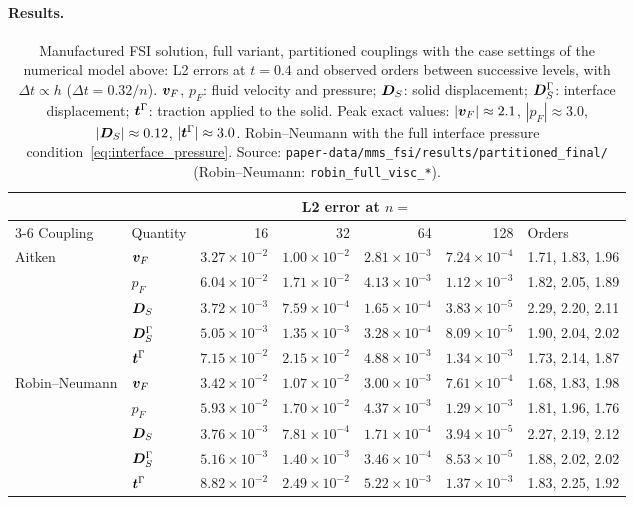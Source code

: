 \paragraph{Results.}
\begin{table}[htbp]
	\centering
	\footnotesize
	\setlength{\tabcolsep}{4pt}
	\caption{Manufactured FSI solution, full variant, partitioned couplings with the case settings of the numerical model above: L2 errors at $t = 0.4$ and observed orders between successive levels, with $\Delta t \propto h$ ($\Delta t = 0.32/n$). $\boldsymbol{v}_F$, $p_F$: fluid velocity and pressure; $\boldsymbol{D}_S$: solid displacement; $\boldsymbol{D}_S^\Gamma$: interface displacement; $\boldsymbol{t}^\Gamma$: traction applied to the solid. Peak exact values: $|\boldsymbol{v}_F| \approx 2.1$, $|p_F| \approx 3.0$, $|\boldsymbol{D}_S| \approx 0.12$, $|\boldsymbol{t}^\Gamma| \approx 3.0$. Robin--Neumann with the full interface pressure condition~\eqref{eq:interface_pressure}. Source: \texttt{paper-data/mms\_fsi/results/partitioned\_final/} (Robin--Neumann: \texttt{robin\_full\_visc\_*}).}
	\label{tab:mms_fsi}
	\begin{tabular}{llrrrrl}
		\toprule
		 & & \multicolumn{4}{c}{L2 error at $n =$} & \\
		\cmidrule(lr){3-6}
		Coupling & Quantity & 16 & 32 & 64 & 128 & Orders \\
		\midrule
		Aitken & $\boldsymbol{v}_F$ & $3.27\times10^{-2}$ & $1.00\times10^{-2}$ & $2.81\times10^{-3}$ & $7.24\times10^{-4}$ & 1.71, 1.83, 1.96 \\
		 & $p_F$ & $6.04\times10^{-2}$ & $1.71\times10^{-2}$ & $4.13\times10^{-3}$ & $1.12\times10^{-3}$ & 1.82, 2.05, 1.89 \\
		 & $\boldsymbol{D}_S$ & $3.72\times10^{-3}$ & $7.59\times10^{-4}$ & $1.65\times10^{-4}$ & $3.83\times10^{-5}$ & 2.29, 2.20, 2.11 \\
		 & $\boldsymbol{D}_S^\Gamma$ & $5.05\times10^{-3}$ & $1.35\times10^{-3}$ & $3.28\times10^{-4}$ & $8.09\times10^{-5}$ & 1.90, 2.04, 2.02 \\
		 & $\boldsymbol{t}^\Gamma$ & $7.15\times10^{-2}$ & $2.15\times10^{-2}$ & $4.88\times10^{-3}$ & $1.34\times10^{-3}$ & 1.73, 2.14, 1.87 \\
		\midrule
		Robin--Neumann & $\boldsymbol{v}_F$ & $3.42\times10^{-2}$ & $1.07\times10^{-2}$ & $3.00\times10^{-3}$ & $7.61\times10^{-4}$ & 1.68, 1.83, 1.98 \\
		 & $p_F$ & $5.93\times10^{-2}$ & $1.70\times10^{-2}$ & $4.37\times10^{-3}$ & $1.29\times10^{-3}$ & 1.81, 1.96, 1.76 \\
		 & $\boldsymbol{D}_S$ & $3.76\times10^{-3}$ & $7.81\times10^{-4}$ & $1.71\times10^{-4}$ & $3.94\times10^{-5}$ & 2.27, 2.19, 2.12 \\
		 & $\boldsymbol{D}_S^\Gamma$ & $5.16\times10^{-3}$ & $1.40\times10^{-3}$ & $3.46\times10^{-4}$ & $8.53\times10^{-5}$ & 1.88, 2.02, 2.02 \\
		 & $\boldsymbol{t}^\Gamma$ & $8.82\times10^{-2}$ & $2.49\times10^{-2}$ & $5.22\times10^{-3}$ & $1.37\times10^{-3}$ & 1.83, 2.25, 1.92 \\
		\bottomrule
	\end{tabular}
\end{table}
